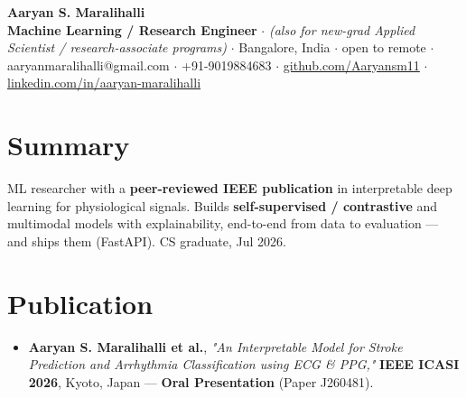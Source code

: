 \documentclass[10pt,a4paper]{article}
\begin{document}
\vspace*{-1cm}
\begin{center}
{\LARGE\bfseries Aaryan S. Maralihalli}\\[0.5em]
\textbf{Machine Learning / Research Engineer} $\cdot$ \textit{(also for new-grad Applied Scientist / research-associate programs)} $\cdot$ Bangalore, India $\cdot$ open to remote $\cdot$ aaryanmaralihalli@gmail.com $\cdot$ +91-9019884683 $\cdot$ \href{https://github.com/Aaryansm11}{github.com/Aaryansm11} $\cdot$ \href{https://linkedin.com/in/aaryan-maralihalli}{linkedin.com/in/aaryan-maralihalli}
\end{center}\vspace{0.4ex}
\section*{Summary}
ML researcher with a \textbf{peer-reviewed IEEE publication} in interpretable deep learning for physiological signals. Builds \textbf{self-supervised / contrastive} and multimodal models with explainability, end-to-end from data to evaluation --- and ships them (FastAPI). CS graduate, Jul 2026.\par\vspace{2pt}
\section*{Publication}
\begin{itemize}
\item \textbf{Aaryan S. Maralihalli et al.}, \textit{"An Interpretable Model for Stroke Prediction and Arrhythmia Classification using ECG \& PPG,"} \textbf{IEEE ICASI 2026}, Kyoto, Japan --- \textbf{Oral Presentation} (Paper J260481).
\end{itemize}
\end{document}
